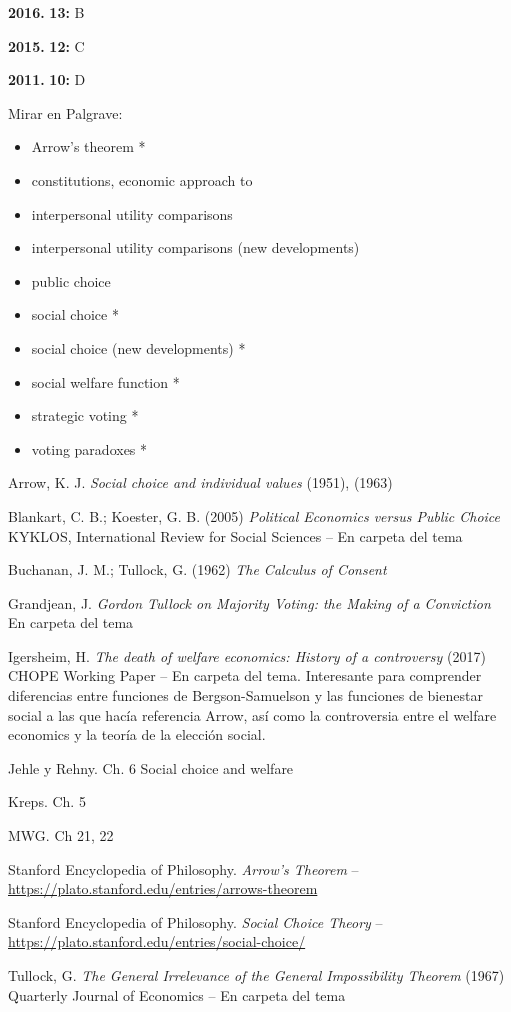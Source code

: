 \documentclass{nuevotema}
\begin{document}
\textbf{2016.} \textbf{13:} B

\textbf{2015.} \textbf{12:} C

\textbf{2011.} \textbf{10:} D

\bibliografia

Mirar en Palgrave:
\begin{itemize}
	\item Arrow's theorem * 
	\item constitutions, economic approach to
	\item interpersonal utility comparisons
	\item interpersonal utility comparisons (new developments)
	\item public choice
	\item social choice * 
	\item social choice (new developments) *
	\item social welfare function *
	\item strategic voting *
	\item voting paradoxes *
\end{itemize}

Arrow, K. J. \textit{Social choice and individual values} (1951), (1963)

Blankart, C. B.; Koester, G. B. (2005) \textit{Political Economics versus Public Choice} KYKLOS, International Review for Social Sciences -- En carpeta del tema

Buchanan, J. M.; Tullock, G. (1962) \textit{The Calculus of Consent} 

Grandjean, J. \textit{Gordon Tullock on Majority Voting: the Making of a Conviction} En carpeta del tema

Igersheim, H. \textit{The death of welfare economics: History of a controversy} (2017) CHOPE Working Paper -- En carpeta del tema. Interesante para comprender diferencias entre funciones de Bergson-Samuelson y las funciones de bienestar social a las que hacía referencia Arrow, así como la controversia entre el welfare economics y la teoría de la elección social.

Jehle y Rehny. Ch. 6 Social choice and welfare

Kreps. Ch. 5

MWG. Ch 21, 22

Stanford Encyclopedia of Philosophy. \textit{Arrow's Theorem} -- \url{https://plato.stanford.edu/entries/arrows-theorem}

Stanford Encyclopedia of Philosophy. \textit{Social Choice Theory} -- \url{https://plato.stanford.edu/entries/social-choice/}

Tullock, G. \textit{The General Irrelevance of the General Impossibility Theorem} (1967) Quarterly Journal of Economics -- En carpeta del tema
\end{document}
